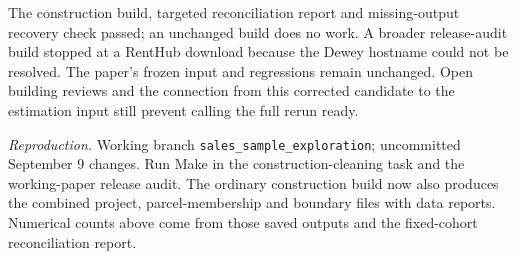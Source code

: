 The construction build, targeted reconciliation report and missing-output recovery check passed; an unchanged build does no work. A broader release-audit build stopped at a RentHub download because the Dewey hostname could not be resolved. The paper's frozen input and regressions remain unchanged. Open building reviews and the connection from this corrected candidate to the estimation input still prevent calling the full rerun ready.

\medskip
\noindent\textit{Reproduction.} Working branch \texttt{sales\_sample\_exploration}; uncommitted September 9 changes. Run Make in the construction-cleaning task and the working-paper release audit. The ordinary construction build now also produces the combined project, parcel-membership and boundary files with data reports. Numerical counts above come from those saved outputs and the fixed-cohort reconciliation report.

